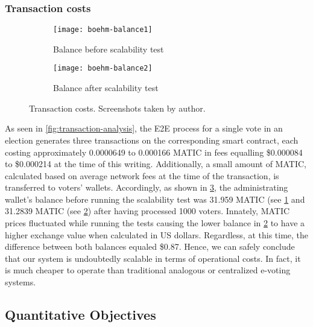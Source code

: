 \subsubsection{Transaction costs}\label{subsubsec:res-transaction-costs}

\begin{figure}[h]
    \begin{subfigure}[b]{0.5\textwidth}
        \centering
        \texttt{[image: boehm-balance1]}
        \caption{Balance before scalability test}
        \label{fig:balance-before}
    \end{subfigure}
    \begin{subfigure}[b]{0.5\textwidth}
        \centering
        \texttt{[image: boehm-balance2]}
        \caption{Balance after scalability test}
        \label{fig:balance-after}
    \end{subfigure}
    \caption{Transaction costs. Screenshots taken by author.}
    \label{fig:transaction-costs}
\end{figure}

As seen in \cref{fig:transaction-analysis}, the \gls{E2E} process for a single vote in an election generates three transactions on the corresponding smart contract, each costing approximately 0.0000649 to 0.000166 MATIC in fees equalling \$0.000084 to \$0.000214 at the time of this writing.
Additionally, a small amount of MATIC, calculated based on average network fees at the time of the transaction, is transferred to voters' wallets.
Accordingly, as shown in \cref{fig:transaction-costs}, the administrating wallet's balance before running the scalability test was 31.959 MATIC (see \cref{fig:balance-before} and 31.2839 MATIC (see \cref{fig:balance-after}) after having processed 1000 voters.
Innately, MATIC prices fluctuated while running the tests causing the lower balance in \cref{fig:balance-after} to have a higher exchange value when calculated in US dollars.
Regardless, at this time, the difference between both balances equaled \$0.87.
Hence, we can safely conclude that our system is undoubtedly scalable in terms of operational costs.
In fact, it is much cheaper to operate than traditional analogous or centralized e-voting systems.


\subsection{Quantitative Objectives}\label{subsec:res-quantitaive-objectives}

